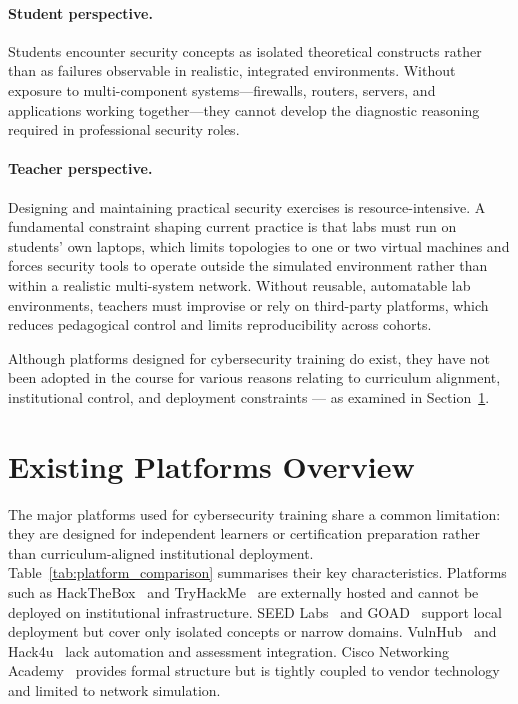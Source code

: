 \paragraph{Student perspective.}
Students encounter security concepts as isolated theoretical constructs rather than
as failures observable in realistic, integrated environments. Without exposure to
multi-component systems---firewalls, routers, servers, and applications working
together---they cannot develop the diagnostic reasoning required in professional
security roles.

\paragraph{Teacher perspective.}
Designing and maintaining practical security exercises is resource-intensive. A fundamental constraint
shaping current practice is that labs must run on students' own laptops, which limits
topologies to one or two virtual machines and forces security tools to operate
outside the simulated environment rather than within a realistic multi-system network.
Without reusable, automatable lab environments, teachers must improvise
or rely on third-party platforms, which reduces pedagogical control and limits
reproducibility across cohorts.

Although platforms designed for cybersecurity training do exist, they have not been
adopted in the course for various reasons relating to curriculum alignment,
institutional control, and deployment constraints --- as examined in
Section~\ref{sec:existing_platforms}.



\section{Existing Platforms Overview}
\label{sec:existing_platforms}

The major platforms used for cybersecurity training share a common limitation: they are designed
for independent learners or certification preparation rather than curriculum-aligned institutional
deployment. Table~\ref{tab:platform_comparison} summarises their key characteristics.
Platforms such as HackTheBox~\cite{hackthebox} and TryHackMe~\cite{tryhackme} are externally hosted
and cannot be deployed on institutional infrastructure. SEED Labs~\cite{seedlabs} and
GOAD~\cite{goad} support local deployment but cover only isolated concepts or narrow domains.
VulnHub~\cite{vulnhub} and Hack4u~\cite{hack4u} lack automation and assessment integration.
Cisco Networking Academy~\cite{cisco_netacad} provides formal structure but is tightly coupled
to vendor technology and limited to network simulation.


